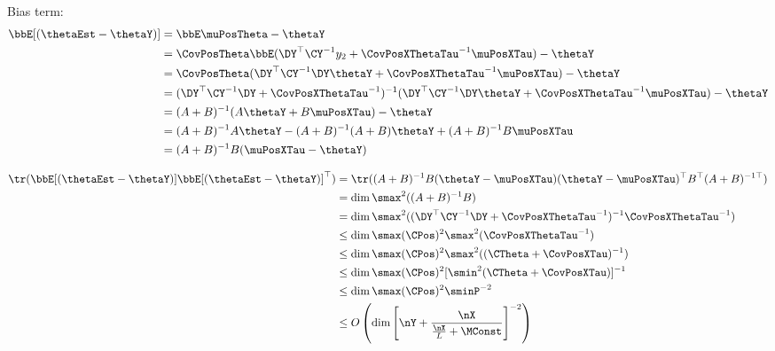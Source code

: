 Bias term:
\begin{align}
\bbE[(\thetaEst - \thetaY)] &= \bbE \muPosTheta - \thetaY\\
&= \CovPosTheta \bbE (\DY^\top \CY^{-1} y_2 + \CovPosXThetaTau^{-1} \muPosXTau) - \thetaY \\
&= \CovPosTheta (\DY^\top \CY^{-1} \DY \thetaY + \CovPosXThetaTau^{-1} \muPosXTau) -\thetaY\\
&= (\DY^\top \CY^{-1} \DY + \CovPosXThetaTau^{-1})^{-1}(\DY^\top \CY^{-1} \DY \thetaY + \CovPosXThetaTau^{-1} \muPosXTau) - \thetaY \\
&= (A+B)^{-1} (A \thetaY + B \muPosXTau) - \thetaY\\
&= (A+B)^{-1} A \thetaY - (A+B)^{-1} (A + B) \thetaY + (A+B)^{-1} B \muPosXTau\\
&= (A+B)^{-1} B (\muPosXTau- \thetaY)
\end{align}

\begin{align}
\tr(\bbE[(\thetaEst - \thetaY)]\bbE[(\thetaEst - \thetaY)]^\top) &= 
\tr( (A+B)^{-1} B (\thetaY - \muPosXTau) (\thetaY - \muPosXTau) ^\top B^\top (A+B)^{-1 \top})\\
&= \dim \smax^2((A+B)^{-1} B)\\ 
&= \dim \smax^2((\DY^\top \CY^{-1} \DY + \CovPosXThetaTau^{-1})^{-1}\CovPosXThetaTau^{-1}) \\
&\le \dim \smax(\CPos)^2 \smax^2(\CovPosXThetaTau^{-1})  \\
&\le \dim \smax(\CPos)^2 \smax^2((\CTheta + \CovPosXTau)^{-1}) \\
&\le \dim \smax(\CPos)^2 [\smin^2(\CTheta + \CovPosXTau)]^{-1} \\
&\le \dim \smax(\CPos)^2 \sminP^{-2} \\
&\le O\left(\dim \left[ \nY + \frac{\nX}{\frac{\nX}{L} + \MConst} \right]^{-2}\right)
\end{align}